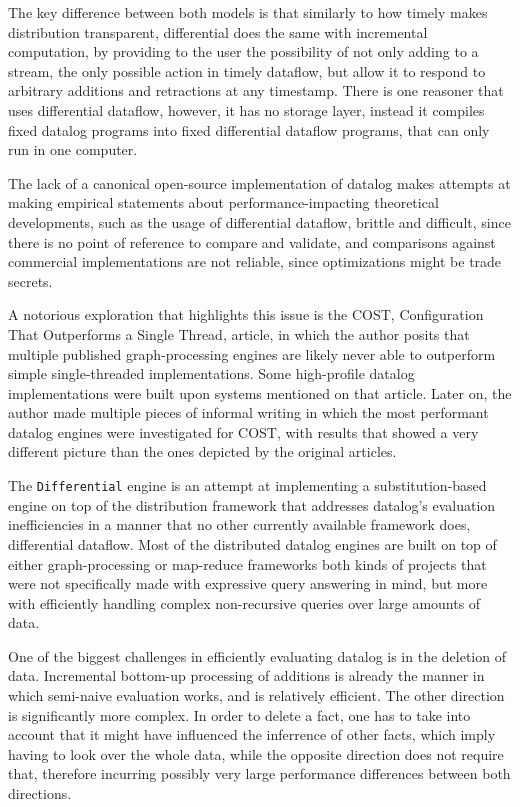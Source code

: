 \documentclass[sigconf,screen,review,natbib]{acmart}
\theoremstyle{definition}
\begin{document}
The key difference between both models is that similarly to how timely makes distribution
transparent, differential does the same with incremental computation, by providing to the user the
possibility of not only adding to a stream, the only possible action in timely dataflow, but
allow it to respond to arbitrary additions and retractions at any timestamp.  There is one
reasoner that uses differential dataflow\cite{ddlog}, however, it has no storage layer, instead
it compiles fixed datalog programs into fixed differential dataflow programs, that can only run in one computer.

The lack of a canonical open-source implementation of datalog makes attempts at making
empirical statements about performance-impacting theoretical developments, such as the usage of
differential dataflow, brittle and difficult, since there is no point of reference to
compare and validate, and comparisons against commercial implementations are not
reliable, since optimizations might be trade secrets.

A notorious exploration that highlights this issue is the COST, Configuration That Outperforms
a Single Thread, article\cite{COST}, in which the author posits that multiple published
graph-processing engines are likely never able to outperform simple single-threaded implementations.
Some high-profile datalog implementations were built upon systems mentioned on that article.
Later on, the author made multiple pieces of informal writing in which the most performant datalog
engines were investigated for COST\cite{blogdynamicdatalog, blogvldbsigmod}, with results that
showed a very different picture than the ones depicted by the original articles.

The \verb|Differential| engine is an attempt at implementing a substitution-based engine on top
of the distribution framework that addresses datalog's evaluation inefficiencies in a manner that
no other currently available framework does, differential dataflow\cite{dd}. Most of the
distributed datalog engines are built on top of either graph-processing or map-reduce frameworks
both kinds of projects that were not specifically made with expressive query answering in mind, but
more with efficiently handling complex non-recursive queries over large amounts of data.

One of the biggest challenges in efficiently evaluating datalog is in the deletion of data.
Incremental bottom-up processing of additions is already the manner in which semi-naive evaluation
works, and is relatively efficient. The other direction is significantly more complex. In order
to delete a fact, one has to take into account that it might have influenced the inferrence of other
facts, which imply having to look over the whole data, while the opposite direction does not
require that, therefore incurring possibly very large performance differences between both directions.
\end{document}
